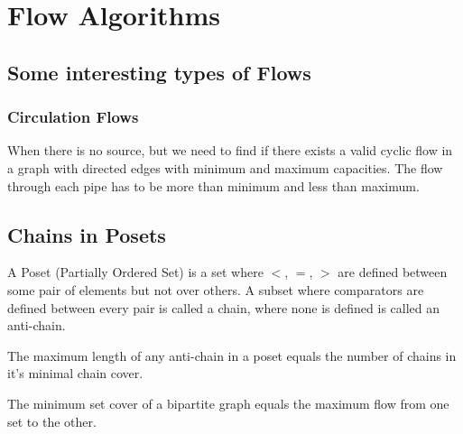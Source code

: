 \chapter{Flow Algorithms}



\section{Some interesting types of Flows}

\subsection{Circulation Flows}

When there is no source, but we need to find if there exists a valid cyclic flow in a graph with directed edges with minimum and maximum capacities. The flow through each pipe has to be more than minimum and less than maximum.



\section{Chains in Posets}

A Poset (Partially Ordered Set) is a set where $<$, $=$, $>$ are defined between some pair of elements but not over others. A subset where comparators are defined between every pair is called a chain, where none is defined is called an anti-chain.

\begin{theorem}{}
    The maximum length of any anti-chain in a poset equals the number of chains in it's minimal chain cover.
\end{theorem}

\begin{theorem}{}
    The minimum set cover of a bipartite graph equals the maximum flow from one set to the other.
\end{theorem}
